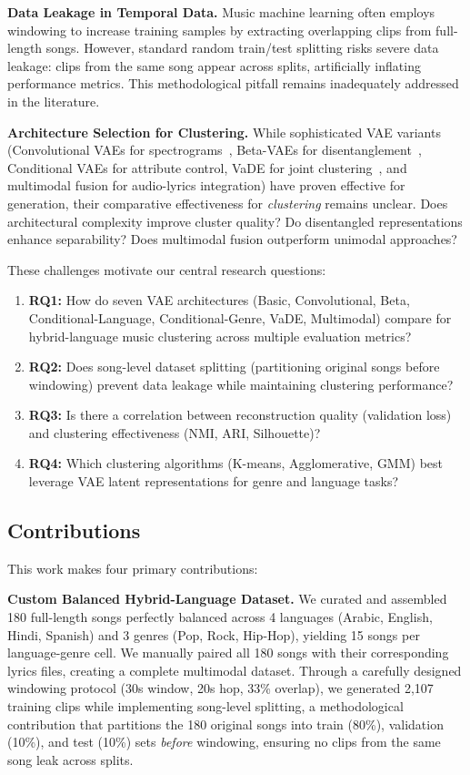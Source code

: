 \documentclass[10pt,twocolumn]{article}
\begin{document}
\textbf{Data Leakage in Temporal Data.} Music machine learning often employs windowing to increase training samples by extracting overlapping clips from full-length songs. However, standard random train/test splitting risks severe data leakage: clips from the same song appear across splits, artificially inflating performance metrics. This methodological pitfall remains inadequately addressed in the literature.

\textbf{Architecture Selection for Clustering.} While sophisticated VAE variants (Convolutional VAEs for spectrograms~\cite{engel2017neural}, Beta-VAEs for disentanglement~\cite{higgins2017beta}, Conditional VAEs for attribute control, VaDE for joint clustering~\cite{jiang2017variational}, and multimodal fusion for audio-lyrics integration) have proven effective for generation, their comparative effectiveness for \emph{clustering} remains unclear. Does architectural complexity improve cluster quality? Do disentangled representations enhance separability? Does multimodal fusion outperform unimodal approaches?

These challenges motivate our central research questions:

\begin{enumerate}
    \item \textbf{RQ1:} How do seven VAE architectures (Basic, Convolutional, Beta, Conditional-Language, Conditional-Genre, VaDE, Multimodal) compare for hybrid-language music clustering across multiple evaluation metrics?
    \item \textbf{RQ2:} Does song-level dataset splitting (partitioning original songs before windowing) prevent data leakage while maintaining clustering performance?
    \item \textbf{RQ3:} Is there a correlation between reconstruction quality (validation loss) and clustering effectiveness (NMI, ARI, Silhouette)?
    \item \textbf{RQ4:} Which clustering algorithms (K-means, Agglomerative, GMM) best leverage VAE latent representations for genre and language tasks?
\end{enumerate}

\subsection{Contributions}

This work makes four primary contributions:

\textbf{Custom Balanced Hybrid-Language Dataset.} We curated and assembled 180 full-length songs perfectly balanced across 4 languages (Arabic, English, Hindi, Spanish) and 3 genres (Pop, Rock, Hip-Hop), yielding 15 songs per language-genre cell. We manually paired all 180 songs with their corresponding lyrics files, creating a complete multimodal dataset. Through a carefully designed windowing protocol (30s window, 20s hop, 33\% overlap), we generated 2,107 training clips while implementing song-level splitting, a methodological contribution that partitions the 180 original songs into train (80\%), validation (10\%), and test (10\%) sets \emph{before} windowing, ensuring no clips from the same song leak across splits.
\end{document}
